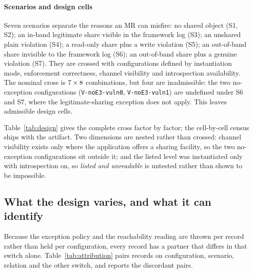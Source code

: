 \paragraph{Scenarios and design cells}
Seven scenarios separate the reasons an MR can misfire: no shared object (S1,
S2); an in-band legitimate share visible in the framework log (S3); an unshared
plain violation (S4); a read-only share plus a write violation (S5); an
out-of-band share invisible to the framework log (S6); an out-of-band share plus a
genuine violation (S7). They are crossed with \ResSynConfigs{} configurations
defined by instantiation mode, enforcement correctness, channel visibility and
introspection availability. The nominal cross is
$7{}\times8{}$ combinations, but four are
inadmissible: the two no-exception configurations (\texttt{V-noE3-vuln0},
\texttt{V-noE3-vuln1}) are undefined under S6 and S7, where the
legitimate-sharing exception does not apply. This leaves \ResDesignCells{}
admissible design cells.

Table~\ref{tab:design} gives the complete cross factor by factor; the cell-by-cell census
ships with the artifact. Two dimensions are
nested rather than crossed: channel visibility exists only where the application
offers a sharing facility, so the two no-exception configurations sit outside it;
and the listed level was instantiated only with introspection on, so \emph{listed
and unreadable} is untested rather than shown to be impossible.



\subsection{What the design varies, and what it can identify}
\label{sec:identify}

Because the exception policy and the reachability reading are thrown per record
rather than held per configuration, every record has a partner that differs in that
switch alone. Table~\ref{tab:attribution} pairs records on configuration, scenario,
relation and the other switch, and reports the discordant pairs.



